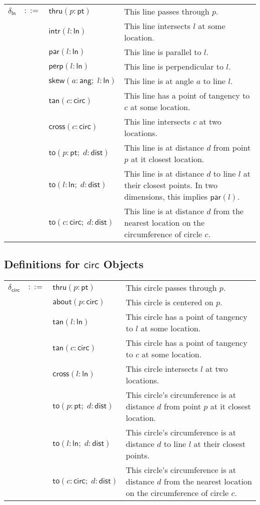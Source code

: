 \documentclass[11pt]{report}
\begin{document}
\begin{tabularx}{\textwidth}{l l l X}
$\delta_{\mathsf{ln}}$ & $::=$ & $\mathsf{thru}(p : \mathsf{pt})$ & This line passes through $p$. \\
 & & $\mathsf{intr}(l : \mathsf{ln})$ & This line intersects $l$ at some location. \\
 & & $\mathsf{par}(l : \mathsf{ln})$ & This line is parallel to $l$. \\
 & & $\mathsf{perp}(l : \mathsf{ln})$ & This line is perpendicular to $l$. \\
 & & $\mathsf{skew}(a : \mathsf{ang}; \; l : \mathsf{ln})$ & This line is at angle $a$ to line $l$. \\
 & & $\mathsf{tan}(c : \mathsf{circ})$ & This line has a point of tangency to $c$ at some location. \\
 & & $\mathsf{cross}(c : \mathsf{circ})$ & This line intersects $c$ at two locations. \\
 & & $\mathsf{to}(p : \mathsf{pt}; \; d : \mathsf{dist})$ & This line is at distance $d$ from point $p$ at it closest location. \\
 & & $\mathsf{to}(l : \mathsf{ln}; \; d : \mathsf{dist})$ & This line is at distance $d$ to line $l$ at their closest points. In two dimensions, this implies $\mathsf{par}(l)$. \\
 & & $\mathsf{to}(c : \mathsf{circ}; \; d : \mathsf{dist})$ & This line is at distance $d$ from the nearest location on the circumference of circle $c$. \\
\end{tabularx}

\subsection{Definitions for $\mathsf{circ}$ Objects}
\label{subsec:def-circ}

\begin{tabularx}{\textwidth}{l l l X}
$\delta_{\mathsf{circ}}$ & $::=$ & $\mathsf{thru}(p : \mathsf{pt})$ & This circle passes through $p$. \\
 & & $\mathsf{about}(p : \mathsf{circ})$ & This circle is centered on $p$. \\
 & & $\mathsf{tan}(l : \mathsf{ln})$ & This circle has a point of tangency to $l$ at some location. \\
 & & $\mathsf{tan}(c : \mathsf{circ})$ & This circle has a point of tangency to $c$ at some location. \\
 & & $\mathsf{cross}(l : \mathsf{ln})$ & This circle intersects $l$ at two locations. \\
 & & $\mathsf{to}(p : \mathsf{pt}; \; d : \mathsf{dist})$ & This circle's circumference is at distance $d$ from point $p$ at it closest location. \\
 & & $\mathsf{to}(l : \mathsf{ln}; \; d : \mathsf{dist})$ & This circle's circumference is at distance $d$ to line $l$ at their closest points. \\
 & & $\mathsf{to}(c : \mathsf{circ}; \; d : \mathsf{dist})$ & This circle's circumference is at distance $d$ from the nearest location on the circumference of circle $c$. \\
\end{tabularx}
\end{document}

